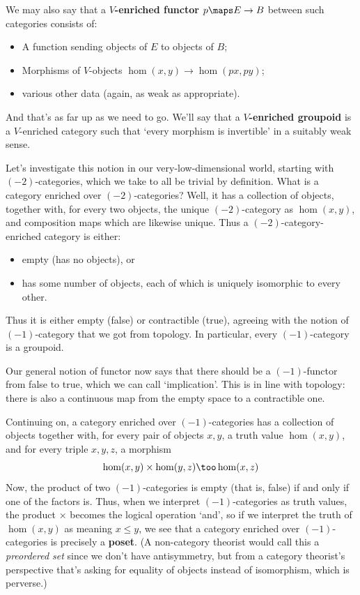 \documentclass[12pt]{amsart}
\begin{document}
We may also say that a \textbf{$V$-enriched functor} $p\maps E\to B$
between such categories consists of:
\begin{itemize}
\item A function sending objects of $E$ to objects of $B$;
\item Morphisms of $V$-objects $\hom(x,y)\to \hom(px,py)$;
\item various other data (again, as weak as appropriate).
\end{itemize}
And that's as far up as we need to go.  We'll say that a
\textbf{$V$-enriched groupoid} is a $V$-enriched category such that
`every morphism is invertible' in a suitably weak sense.

Let's investigate this notion in our very-low-dimensional world,
starting with $(-2)$-categories, which we take to all be trivial by
definition.  What is a category enriched over $(-2)$-categories?
Well, it has a collection of objects, together with, for every two
objects, the unique $(-2)$-category as $\hom(x,y)$, and composition
maps which are likewise unique.  Thus a $(-2)$-category-enriched
category is either:
\begin{itemize}
\item empty (has no objects), or
\item has some number of objects, each of which is uniquely isomorphic
  to every other.
\end{itemize}
Thus it is either empty (false) or contractible (true), agreeing with
the notion of $(-1)$-category that we got from topology.  In
particular, every $(-1)$-category is a groupoid.

Our general notion of functor now says that there should be a
$(-1)$-functor from false to true, which we can call `implication'.
This is in line with topology: there is also a continuous map from the
empty space to a contractible one.

Continuing on, a category enriched over $(-1)$-categories has a
collection of objects together with, for every pair of objects $x,y$,
a truth value $\hom(x,y)$, and for every triple $x,y,z$, a morphism
\[
\hom(x,y) \times \hom(y,z) \too \hom(x,z)
\]
Now, the product of two $(-1)$-categories is empty (that is,
false) if and only if one of the factors is.  Thus, when we interpret
$(-1)$-categories as truth values, the product $\times$ becomes the
logical operation `and', so if we interpret the truth of $\hom(x,y)$
as meaning $x\le y$, we see that a category enriched over
$(-1)$-categories is precisely a \textbf{poset}.  (A non-category
theorist would call this a \emph{preordered set} since we don't have
antisymmetry, but from a category theorist's perspective that's asking
for equality of objects instead of isomorphism, which is perverse.)
\end{document}
